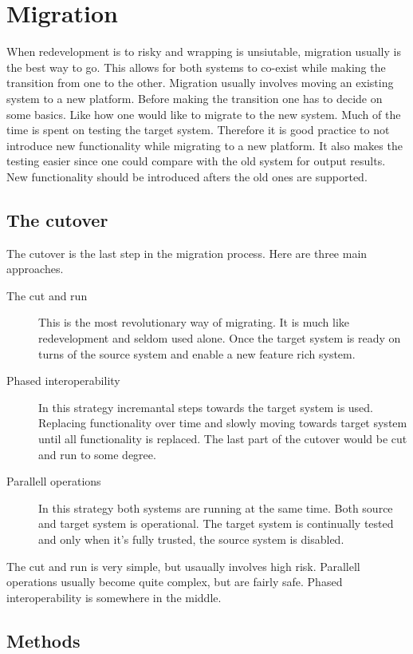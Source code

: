 \section{Migration}
When redevelopment is to risky and wrapping is unsiutable, migration usually is the best way to go.
This allows for both systems to co-exist while making the transition from one to the other.
Migration usually involves moving an existing system to a new platform.
Before making the transition one has to decide on some basics. Like how one would like to migrate to the new system.
Much of the time is spent on testing the target system. Therefore it is good practice to not introduce new functionality while migrating to a new platform.
It also makes the testing easier since one could compare with the old system for output results.
New functionality should be introduced afters the old ones are supported.
\subsection{The cutover}
The cutover is the last step in the migration process. 
Here are three main approaches\cite{23}.
\begin{description}
\item[The cut and run]This is the most revolutionary way of migrating. It is much like redevelopment and seldom used alone. Once the target system is ready on turns of the source system and enable a new feature rich system.
\item[Phased interoperability]In this strategy incremantal steps towards the target system is used. Replacing functionality over time and slowly moving towards target system until all functionality is replaced. The last part of the cutover would be cut and run to some degree.
\item[Parallell operations]In this strategy both systems are running at the same time. Both source and target system is operational. The target system is continually tested and only when it's fully trusted, the source system is disabled.
\end{description}
The cut and run is very simple, but usaually involves high risk. Parallell operations usually become quite complex, but are fairly safe.
Phased interoperability is somewhere in the middle.
\subsection{Methods}
